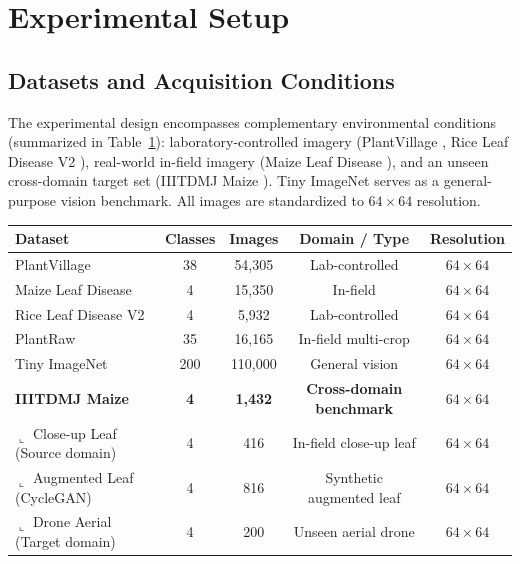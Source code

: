 \documentclass[]{interact}
\theoremstyle{plain}
\theoremstyle{definition}
\theoremstyle{remark}
\begin{document}
\section{Experimental Setup}
{\color{blue}
\label{sec:experimental-setup}

\subsection{Datasets and Acquisition Conditions}

The experimental design encompasses complementary environmental conditions (summarized in Table~\ref{tab:datasets}): laboratory-controlled imagery (PlantVillage \citep{hughes2015plantvillage}, Rice Leaf Disease V2 \citep{rice_dataset2022}), real-world in-field imagery (Maize Leaf Disease \citep{mduma2023maize}), and an unseen cross-domain target set (IIITDMJ Maize \citep{iiitdmj2024dataset}). Tiny ImageNet \citep{le2015tiny} serves as a general-purpose vision benchmark. All images are standardized to $64 \times 64$ resolution.

\begin{table}[H]
\centering
\small
{}
{\begin{tabular}{lcccc} \toprule
\textbf{Dataset} & \textbf{Classes} & \textbf{Images} & \textbf{Domain / Type} & \textbf{Resolution} \\ \midrule
PlantVillage \citep{hughes2015plantvillage} & 38 & 54,305 & Lab-controlled & $64 \times 64$ \\
Maize Leaf Disease \citep{mduma2023maize} & 4 & 15,350 & In-field & $64 \times 64$ \\
Rice Leaf Disease V2 \citep{rice_dataset2022} & 4 & 5,932 & Lab-controlled & $64 \times 64$ \\
PlantRaw \citep{tongle2026plantraw} & 35 & 16,165 & In-field multi-crop & $64 \times 64$ \\
Tiny ImageNet \citep{le2015tiny} & 200 & 110,000 & General vision & $64 \times 64$ \\ \midrule
\textbf{IIITDMJ Maize} \citep{iiitdmj2024dataset} & \textbf{4} & \textbf{1,432} & \textbf{Cross-domain benchmark} & \textbf{$64 \times 64$} \\
\quad $\llcorner$ Close-up Leaf (Source domain) & 4 & 416 & In-field close-up leaf & $64 \times 64$ \\
\quad $\llcorner$ Augmented Leaf (CycleGAN) & 4 & 816 & Synthetic augmented leaf & $64 \times 64$ \\
\quad $\llcorner$ Drone Aerial (Target domain) & 4 & 200 & Unseen aerial drone & $64 \times 64$ \\ \bottomrule
\end{tabular}}
\label{tab:datasets}
\end{table}

}
\end{document}
